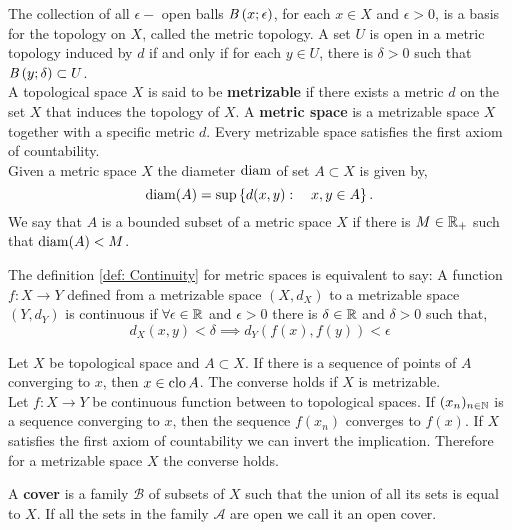 The collection of all $\epsilon-$ open balls $\mathit{B}\left( x; \epsilon \right)$, for each $x\in X$ and $\epsilon>0$, is a basis for the topology on $X$, called the metric topology. A set $U$ is open in a metric topology induced by $d$ if and only if for each $y\in U$, there is $\delta>0$ such that $\mathit{B}\left( y; \delta \right)\subset U$.\\

A topological space $X$ is said to be \textbf{metrizable} if there exists a metric $d$ on the set $X$ that induces the topology of $X$. A \textbf{metric space} is a metrizable space $X$ together with a specific metric $d$. Every metrizable space satisfies the first axiom of countability.\\

Given a metric space $X$ the diameter $\mathrm{diam}$ of set $A\subset X$ is given by,
\begin{equation*}
	\mathrm{diam}(A)=\sup\left\lbrace d(x,y): \quad x, y \in A \right\rbrace.
\end{equation*} 
We say that $A$ is a bounded subset of a metric space $X$ if there is $M\in \mathbb{R}_+$ such that $\mathrm{diam}(A)<M$.

\begin{definition}
	The definition \ref{def: Continuity} for metric spaces is equivalent to say: A function $f:X\rightarrow Y$ defined from a metrizable space $(X, d_X)$ to a metrizable space $(Y, d_Y)$ is continuous if $\forall \epsilon\in\mathbb{R}$ and $\epsilon>0$ there is $\delta \in \mathbb{R}$ and $\delta>0$ such that,
	\begin{equation*}
		d_X(x, y)<\delta \implies d_Y(f(x),f(y))<\epsilon
	\end{equation*}
\end{definition}
Let $X$ be topological space and $A\subset X$. If there is a sequence of points of $A$ converging to $x$, then $x\in\mathrm{clo}\, A$. The converse holds if $X$ is metrizable. \\

Let $f: X\rightarrow Y$ be continuous function between to topological spaces. If $(x_n)_{n\in \mathbb{N}}$ is a sequence converging to $x$, then the sequence $f(x_n)$ converges to $f(x)$. If $X$ satisfies the first axiom of countability we can invert the implication. Therefore for a metrizable space $X$ the converse holds. 



A \textbf{ cover} is a family $\mathcal B$ of subsets of $X$ such that the union of all its sets is equal to $X$. If all the sets in the family $\mathcal A$ are open we call it an open cover. 

